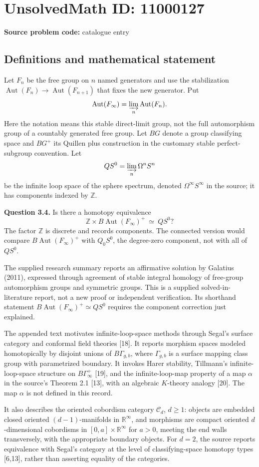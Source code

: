 \documentclass[11pt]{article}
\newcommand{\Z}{\mathbb{Z}}
\newcommand{\R}{\mathbb{R}}
\begin{document}
\section*{UnsolvedMath ID: 11000127}
\textbf{Source problem code:} catalogue entry
\subsection{Definitions and mathematical statement}
Let $F_n$ be the free group on $n$ named generators and use the stabilization $\operatorname{Aut}(F_n)\to\operatorname{Aut}(F_{n+1})$ that fixes the new generator. Put
\[
 \operatorname{Aut}(F_\infty)=\varinjlim_n\operatorname{Aut}(F_n).
\]
Here the notation means this stable direct-limit group, not the full automorphism group of a countably generated free group. Let $BG$ denote a group classifying space and $BG^+$ its Quillen plus construction in the customary stable perfect-subgroup convention. Let
\[
 QS^0=\varinjlim_n\Omega^nS^n
\]
be the infinite loop space of the sphere spectrum, denoted $\Omega^\infty S^\infty$ in the source; it has components indexed by $\Z$.

\textbf{Question 3.4.} Is there a homotopy equivalence
\[
 \Z\times B\operatorname{Aut}(F_\infty)^+\ \simeq\ QS^0?
\]
The factor $\Z$ is discrete and records components. The connected version would compare $B\operatorname{Aut}(F_\infty)^+$ with $Q_0S^0$, the degree-zero component, not with all of $QS^0$.

The supplied research summary reports an affirmative solution by Galatius (2011), expressed through agreement of stable integral homology of free-group automorphism groups and symmetric groups. This is a supplied solved-in-literature report, not a new proof or independent verification. Its shorthand statement $B\operatorname{Aut}(F_\infty)^+\simeq QS^0$ requires the component correction just explained.

The appended text motivates infinite-loop-space methods through Segal's surface category and conformal field theories [18]. It reports morphism spaces modeled homotopically by disjoint unions of $B\Gamma_{g,b}$, where $\Gamma_{g,b}$ is a surface mapping class group with parametrized boundary. It invokes Harer stability, Tillmann's infinite-loop-space structure on $B\Gamma_\infty^+$ [19], and the infinite-loop-map property of a map $\alpha$ in the source's Theorem 2.1 [13], with an algebraic $K$-theory analogy [20]. The map $\alpha$ is not defined in this record.

It also describes the oriented cobordism category $\mathcal C_d$, $d\ge1$: objects are embedded closed oriented $(d-1)$-manifolds in $\R^\infty$, and morphisms are compact oriented $d$-dimensional cobordisms in $[0,a]\times\R^\infty$ for $a>0$, meeting the end walls transversely, with the appropriate boundary objects. For $d=2$, the source reports equivalence with Segal's category at the level of classifying-space homotopy types [6,13], rather than asserting equality of the categories.
\end{document}
